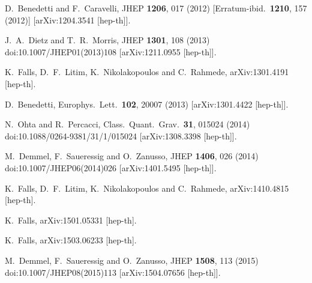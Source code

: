 \documentclass[twocolumn,prd,superscriptaddress,preprintnumbers,amsmath,amssymb,nofootinbib]{revtex4}
\begin{document}
\begin{thebibliography}{99}
  D.~Benedetti and F.~Caravelli,
  JHEP {\bf 1206}, 017 (2012)
  [Erratum-ibid.\  {\bf 1210}, 157 (2012)]
  [arXiv:1204.3541 [hep-th]].

  J.~A.~Dietz and T.~R.~Morris,
  JHEP {\bf 1301}, 108 (2013)
  doi:10.1007/JHEP01(2013)108
  [arXiv:1211.0955 [hep-th]].


  K.~Falls, D.~F.~Litim, K.~Nikolakopoulos and C.~Rahmede,
  arXiv:1301.4191 [hep-th].

  D.~Benedetti,
  Europhys.\ Lett.\  {\bf 102}, 20007 (2013)
  [arXiv:1301.4422 [hep-th]].

  N.~Ohta and R.~Percacci,
  Class.\ Quant.\ Grav.\  {\bf 31}, 015024 (2014)
  doi:10.1088/0264-9381/31/1/015024
  [arXiv:1308.3398 [hep-th]].
  
  M.~Demmel, F.~Saueressig and O.~Zanusso,
  JHEP {\bf 1406}, 026 (2014)
  doi:10.1007/JHEP06(2014)026
  [arXiv:1401.5495 [hep-th]].

  K.~Falls, D.~F.~Litim, K.~Nikolakopoulos and C.~Rahmede,
  arXiv:1410.4815 [hep-th].
  
  K.~Falls,
  arXiv:1501.05331 [hep-th].
  
  K.~Falls,
  arXiv:1503.06233 [hep-th].
  
  M.~Demmel, F.~Saueressig and O.~Zanusso,
  JHEP {\bf 1508}, 113 (2015)
  doi:10.1007/JHEP08(2015)113
  [arXiv:1504.07656 [hep-th]].
  

\end{thebibliography}
\end{document}

